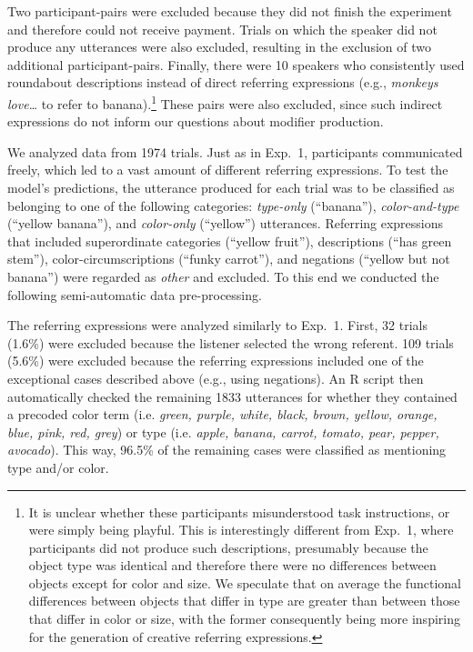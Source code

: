 \documentclass[11pt]{article}
\begin{document}
Two participant-pairs were excluded because they did not finish the experiment and therefore could not receive payment. Trials on which the speaker did not produce any utterances were also excluded, resulting in the exclusion of two additional participant-pairs.
Finally, there were 10 speakers who consistently used roundabout descriptions instead of direct referring expressions (e.g., \emph{monkeys love\dots} to refer to banana).\footnote{It is unclear whether these participants misunderstood task instructions, or were simply being playful. This is interestingly different from Exp.~1, where participants did not produce such descriptions, presumably because the object type was identical and therefore there were no differences between objects except for color and size. We speculate that on average the functional differences between objects that differ in type are greater than between those that differ in color or size, with the former consequently being more inspiring for the generation of creative referring expressions.} These pairs were also excluded, since such indirect expressions do not inform our questions about modifier production.

We analyzed data from 1974 trials. Just as in Exp.~1, participants communicated freely, which led to a vast amount of different referring expressions. To test the model's predictions, the utterance produced for each trial was to be classified as belonging to one of the following categories: \textit{type-only} (``banana''), \textit{color-and-type} (``yellow banana''), and \textit{color-only} (``yellow'') utterances. Referring expressions that included superordinate categories (``yellow fruit''), descriptions (``has green stem''), color-circumscriptions (``funky carrot''), and negations (``yellow but not banana'') were regarded as \textit{other} and excluded. To this end we conducted the following semi-automatic data pre-processing.

The referring expressions were analyzed similarly to Exp.~1. First, 32 trials (1.6\%) were excluded because the listener selected the wrong referent. 109 trials (5.6\%) were excluded because the referring expressions included one of the exceptional cases described above (e.g., using negations). 
An R script then automatically checked the remaining 1833 utterances for whether they contained a precoded color term (i.e. \emph{green, purple, white, black, brown, yellow, orange, blue, pink, red, grey}) or type (i.e. \emph{apple, banana, carrot, tomato, pear, pepper, avocado}). This way, 96.5\% of the remaining cases were classified as mentioning type and/or color. 
\end{document}
